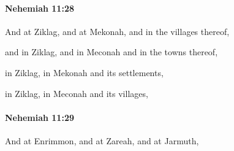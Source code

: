 		\paragraph{Nehemiah 11:28} %
			\label{NEHEMIAH-11-28}

			And at Ziklag, and at Mekonah, and in the villages thereof,

			\begin{versebox}
					\item[BHS] 
					\item[ASV] and in Ziklag, and in Meconah and in the towns thereof,
					\item[NIV] in Ziklag, in Mekonah and its settlements,
					\item[NRSV] in Ziklag, in Meconah and its villages,
			\end{versebox}

		\paragraph{Nehemiah 11:29} %
			\label{NEHEMIAH-11-29}

			And at Enrimmon, and at Zareah, and at Jarmuth,

